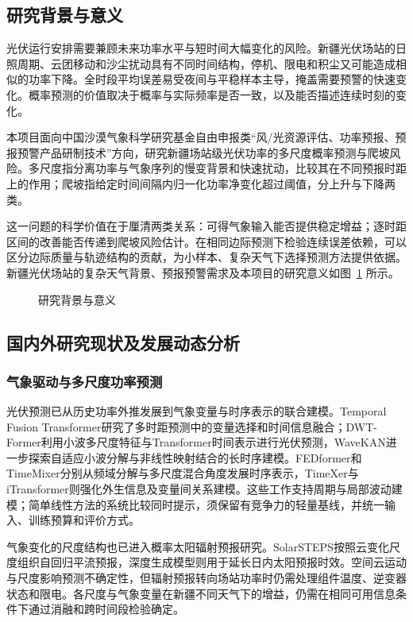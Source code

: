 \subsection{研究背景与意义}
光伏运行安排需要兼顾未来功率水平与短时间大幅变化的风险。新疆光伏场站的日照周期、云团移动和沙尘扰动具有不同时间结构，停机、限电和积尘又可能造成相似的功率下降。全时段平均误差易受夜间与平稳样本主导，掩盖需要预警的快速变化。概率预测的价值取决于概率与实际频率是否一致，以及能否描述连续时刻的变化\cite{gneiting2023solar,hobbs2022ramp}。

本项目面向中国沙漠气象科学研究基金自由申报类“风/光资源评估、功率预报、预报预警产品研制技术”方向，研究新疆场站级光伏功率的多尺度概率预测与爬坡风险。多尺度指分离功率与气象序列的慢变背景和快速扰动，比较其在不同预报时距上的作用；爬坡指给定时间间隔内归一化功率净变化超过阈值，分上升与下降两类。

这一问题的科学价值在于厘清两类关系：可得气象输入能否提供稳定增益；逐时距区间的改善能否传递到爬坡风险估计。在相同边际预测下检验连续误差依赖，可以区分边际质量与轨迹结构的贡献，为小样本、复杂天气下选择预测方法提供依据。
新疆光伏场站的复杂天气背景、预报预警需求及本项目的研究意义如图~\ref{fig:xj-f01} 所示。
\begin{figure}[!ht]
\centering

\caption{研究背景与意义}
\label{fig:xj-f01}
\end{figure}

\subsection{国内外研究现状及发展动态分析}
\subsubsection{气象驱动与多尺度功率预测}
光伏预测已从历史功率外推发展到气象变量与时序表示的联合建模。Temporal Fusion Transformer研究了多时距预测中的变量选择和时间信息融合\cite{lim2021tft}；DWT-Former利用小波多尺度特征与Transformer时间表示进行光伏预测，WaveKAN进一步探索自适应小波分解与非线性映射结合的长时序建模\cite{sun2025dwt,liu2026wavekan}。FEDformer和TimeMixer分别从频域分解与多尺度混合角度发展时序表示，TimeXer与iTransformer则强化外生信息及变量间关系建模\cite{zhou2022fedformer,wang2024timemixer,wang2024timexer,liu2024itransformer}。这些工作支持周期与局部波动建模；简单线性方法的系统比较同时提示，须保留有竞争力的轻量基线，并统一输入、训练预算和评价方式\cite{zeng2023linear}。

气象变化的尺度结构也已进入概率太阳辐射预报研究。SolarSTEPS按照云变化尺度组织自回归平流预报，深度生成模型则用于延长日内太阳预报时效\cite{carpentieri2023solarsteps,carpentieri2025shadecast}。空间云运动与尺度影响预测不确定性，但辐射预报转向场站功率时仍需处理组件温度、逆变器状态和限电。各尺度与气象变量在新疆不同天气下的增益，仍需在相同可用信息条件下通过消融和跨时间段检验确定。

